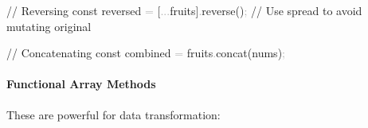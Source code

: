 \documentclass[
  justified,
  openright,
]{tufte-book}
\let\subsubsection\paragraph
\let\paragraph\paragraph
\newcommand{\CommentTok}[1]{\textcolor{MidGray}{#1}}
\newcommand{\FunctionTok}[1]{\textcolor{BrandBlue}{#1}}
\newcommand{\KeywordTok}[1]{\textcolor{BrandBlue}{#1}}
\newcommand{\NormalTok}[1]{#1}
\newcommand{\OperatorTok}[1]{\textcolor{DarkGray}{#1}}
\newenvironment{Shaded}{%
  \begin{snugshade}
}{%
  \end{snugshade}
}
\let\subsubsection\paragraph
\let\paragraph\paragraph
\begin{document}
\begin{Shaded}
\begin{Highlighting}[]
\CommentTok{// Reversing}
\KeywordTok{const}\NormalTok{ reversed }\OperatorTok{=}\NormalTok{ [}\OperatorTok{...}\NormalTok{fruits]}\OperatorTok{.}\FunctionTok{reverse}\NormalTok{()}\OperatorTok{;} \CommentTok{// Use spread to avoid mutating original}

\CommentTok{// Concatenating}
\KeywordTok{const}\NormalTok{ combined }\OperatorTok{=}\NormalTok{ fruits}\OperatorTok{.}\FunctionTok{concat}\NormalTok{(nums)}\OperatorTok{;}
\end{Highlighting}
\end{Shaded}

\subsubsection{Functional Array Methods}\label{functional-array-methods}

These are powerful for data transformation:
\end{document}
